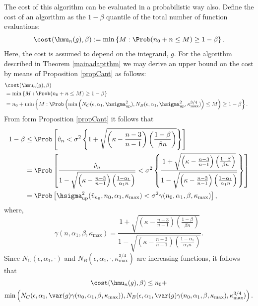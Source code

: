 \documentclass[12pt]{amsart}
\newcommand{\hv}{\hat{v}}
\begin{document}
The cost of this algorithm can be evaluated in a probabilistic way also.  Define the cost of an algorithm as the $1-\beta$ quantile of the total number of function evaluations:
\begin{equation}
\cost(\hmu_n(g),\beta) := \min\left\{M : \Prob(n_0 + n \le M) \ge 1-\beta  \right \}.
\end{equation}
Here, the cost is assumed to depend on the integrand, $g$.  For the algorithm described in Theorem \ref{mainadaptthm} we may derive an upper bound on the cost by means of Proposition \ref{propCant} as follows:
\begin{align*}
\lefteqn{\cost(\hmu_n(g),\beta)} \\
&= \min\left\{M : \Prob(n_0 + n \le M) \ge 1-\beta  \right \}\\
& = n_0 + \min\left\{M : \Prob\left( \min\left( N_C(\epsilon,\alpha_1,\hsigma^2_{\text{\rm up}}), N_B(\epsilon,\alpha_1,\hsigma^2_{\text{\rm up}},\kappa_{\max}^{3/4}) \right) \le M\right) \ge 1-\beta  \right \}.
\end{align*}
From form Proposition \ref{propCant} it follows that
\begin{align*}
1-\beta & \le \Prob\left[\hv_n < \sigma^2 \left\{1 + \sqrt{\left ( \kappa  - \frac{n-3}{n-1}\right)\left(\frac{1-\beta}{\beta n}\right)}\right\} \right] \\
& = \Prob\left[\frac{\hv_n} {1 - \sqrt{\left ( \kappa  - \frac{n-3}{n-1}\right)\left(\frac{1-\alpha_1}{\alpha_1 n}\right)}} < \sigma^2 \left\{\frac{1 + \sqrt{\left ( \kappa  - \frac{n-3}{n-1}\right)\left(\frac{1-\beta}{\beta n}\right)}} {1 - \sqrt{\left ( \kappa  - \frac{n-3}{n-1}\right)\left(\frac{1-\alpha_1}{\alpha_1 n}\right)}} \right\} \right] \\
& = \Prob\left[\hsigma^2_{\text{\rm up}}(\hv_{n_0},n_0,\alpha_1,\kappa_{\max}) < \sigma^2 \gamma(n_0,\alpha_1,\beta,\kappa_{\max}) \right],
\end{align*}
where,
\[
\gamma(n,\alpha_1,\beta,\kappa_{\max}) = \frac{1 + \sqrt{\left ( \kappa  - \frac{n-3}{n-1}\right)\left(\frac{1-\beta}{\beta n}\right)}} {1 - \sqrt{\left ( \kappa  - \frac{n-3}{n-1}\right)\left(\frac{1-\alpha_1}{\alpha_1 n}\right)}}.
\]
Since $N_C(\epsilon,\alpha_1, \cdot)$ and $N_B(\epsilon,\alpha_1, \cdot,\kappa_{\max}^{3/4})$ are increasing functions, it follows that
\begin{multline} \label{adaptcost}
\cost(\hmu_n(g),\beta) \le n_0 + \\
\min\left( N_C(\epsilon,\alpha_1,\var(g)\gamma(n_0,\alpha_1,\beta,\kappa_{\max})), N_B(\epsilon,\alpha_1,\var(g)\gamma(n_0,\alpha_1,\beta,\kappa_{\max}),\kappa_{\max}^{3/4}) \right).
\end{multline}
\end{document}
